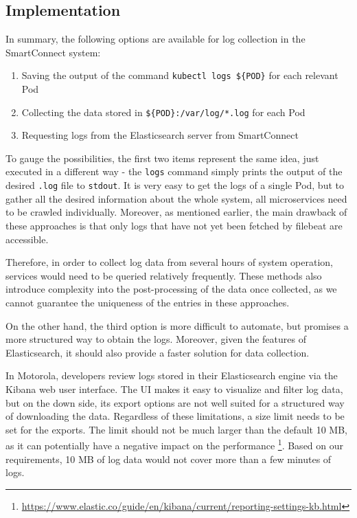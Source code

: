 \subsection{Implementation}

In summary, the following options are available for log collection in the SmartConnect system:
\begin{enumerate}
\item Saving the output of the command \texttt{kubectl logs \$\{POD\}} for each relevant Pod 
\item Collecting the data stored in \texttt{\$\{POD\}:/var/log/*.log} for each Pod \item Requesting logs from the Elasticsearch server from SmartConnect
\end{enumerate}


To gauge the possibilities, the first two items represent the same idea, just executed in a different way - the \texttt{logs} command simply prints the output of the desired \texttt{.log} file to \texttt{stdout}. 
It is very easy to get the logs of a single Pod, but to gather all the desired information about the whole system, all microservices need to be crawled individually. Moreover, as mentioned earlier, the main drawback of these approaches is that only logs that have not yet been fetched by filebeat are accessible.

Therefore, in order to collect log data from several hours of system operation, services would need to be queried relatively frequently. These methods also introduce complexity into the post-processing of the data once collected, as we cannot guarantee the uniqueness of the entries in these approaches.

On the other hand, the third option is more difficult to automate, but promises a more structured way to obtain the logs. Moreover, given the features of Elasticsearch, it should also provide a faster solution for data collection.

In Motorola, developers review logs stored in their Elasticsearch engine via the Kibana web user interface. The UI makes it easy to visualize and filter log data, but on the down side, its export options are not well suited for a structured way of downloading the data. Regardless of these limitations, a size limit needs to be set for the exports. The limit should not be much larger than the default 10 MB, as it can potentially have a negative impact on the performance \footnote{\url{https://www.elastic.co/guide/en/kibana/current/reporting-settings-kb.html}}. Based on our requirements, 10 MB of log data would not cover more than a few minutes of logs.

